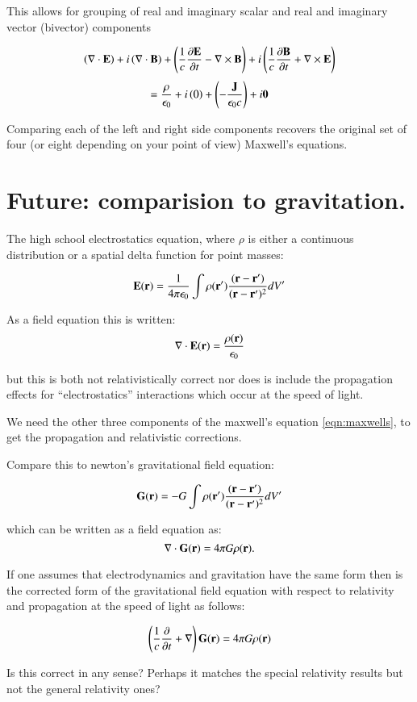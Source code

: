 \documentclass{article}      %
\begin{document}
This allows for grouping of real and imaginary scalar and real and imaginary vector (bivector) components

\[
   \left(\nabla \cdot \mathbf{E}\right) + i\left(\nabla \cdot \mathbf{B}\right)
+
   \left(\frac{1}{c} \frac{\partial \mathbf{E}}{\partial t} - \nabla \times \mathbf{B}\right)
+ i\left(\frac{1}{c} \frac{\partial \mathbf{B}}{\partial t} + \nabla \times \mathbf{E}\right)
\]
\[
= \frac{\rho}{\epsilon_0} + i\left(0\right) + \left(-\frac{\mathbf{J}}{\epsilon_0 c}\right) + i \mathbf{0}
\]

Comparing each of the left and right side components recovers the original set of four (or eight depending on your point of view) Maxwell's equations.

\section{ Future: comparision to gravitation. }


The high school electrostatics equation, where $\rho$ is either a continuous distribution or a spatial delta function for point masses:

\[
\mathbf{E}(\mathbf{r}) = \frac{1}{4 \pi \epsilon_0}\int{\rho(\mathbf{r}') \frac{(\mathbf{r}-\mathbf{r}')}{(\mathbf{r}-\mathbf{r}')^2}}dV'
\]

As a field equation this is written:
\[
\nabla \cdot \mathbf{E}(\mathbf{r}) = \frac{\rho(\mathbf{r})}{\epsilon_0}
\]

but this is both not relativistically correct nor does is 
include the propagation effects for ``electrostatics'' interactions
which occur at the speed of light.

We need the other three components of the maxwell's 
equation \ref{eqn:maxwells}, to get the propagation and relativistic
corrections.

Compare this to newton's gravitational field equation:

\[
\mathbf{G}(\mathbf{r}) = -G\int{\rho(\mathbf{r}') \frac{(\mathbf{r}-\mathbf{r}')}{(\mathbf{r}-\mathbf{r}')^2}}dV'
\]


which can be written as a field equation as:
\[
\nabla \cdot \mathbf{G}(\mathbf{r}) = 4\pi G \rho(\mathbf{r}).
\]

If one assumes that electrodynamics and gravitation
have the same form then is the corrected form of the gravitational field
equation with respect to relativity and propagation at the speed of light
as follows:

\begin{equation}\label{eqn:maybegravityfield}
\left(\frac{1}{c} \frac{\partial}{\partial t} + \nabla\right)\mathbf{G}(\mathbf{r}) = 
4 \pi G \rho(\mathbf{r})
\end{equation}

Is this correct in any sense?  Perhaps it matches the special relativity results
but not the general relativity ones?
\end{document}

